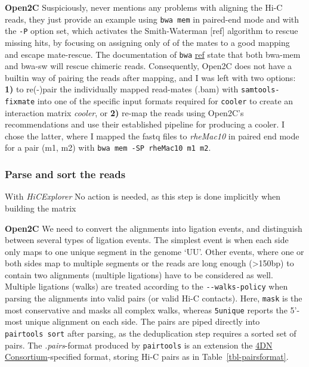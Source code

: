 \documentclass[
  11pt,
  a4paper,
]{scrbook}
\let\oldemph\emph
\renewcommand\emph[1]{\oldemph{\color{gray}#1}}
\begin{document}
\textbf{Open2C} Suspiciously, \citep{open2c} never mentions any problems
with aligning the Hi-C reads, they just provide an example using
\texttt{bwa\ mem} in paired-end mode and with the \texttt{-P} option
set, which activates the Smith-Waterman {[}ref{]} algorithm to rescue
missing hits, by focusing on assigning only of of the mates to a good
mapping and escape mate-rescue. The documentation of \texttt{bwa}
\href{https://bio-bwa.sourceforge.net}{ref} state that both bwa-mem and
bwa-sw will rescue chimeric reads. Consequently, Open2C does not have a
builtin way of pairing the reads after mapping, and I was left with two
options: \textbf{1)} to re(-)pair the individually mapped read-mates
(.bam) with \texttt{samtools-fixmate} into one of the specific input
formats required for \texttt{cooler} to create an interaction matrix
\emph{cooler}, or \textbf{2)} re-map the reads using Open2C's
recommendations and use their established pipeline for producing a
cooler. I chose the latter, where I mapped the fastq files to
\emph{rheMac10} in paired end mode for a pair (m1, m2) with
\texttt{bwa\ mem\ -SP\ rheMac10\ m1\ m2}.

\subsubsection{Parse and sort the reads}\label{parse-and-sort-the-reads}

With \emph{HiCExplorer} No action is needed, as this step is done
implicitly when building the matrix

\textbf{Open2C} We need to convert the alignments into ligation events,
and distinguish between several types of ligation events. The simplest
event is when each side only maps to one unique segment in the genome
`UU'. Other events, where one or both sides map to multiple segments or
the reads are long enough (\textgreater150bp) to contain two alignments
(multiple ligations) have to be considered as well. Multiple ligations
(walks) are treated according to the \texttt{-\/-walks-policy} when
parsing the alignments into valid pairs (or valid Hi-C contacts). Here,
\texttt{mask} is the most conservative and masks all complex walks,
whereas \texttt{5unique} reports the 5'-most unique alignment on each
side. The pairs are piped directly into \texttt{pairtools\ sort} after
parsing, as the deduplication step requires a sorted set of pairs. The
\emph{.pairs}-format produced by \texttt{pairtools} is an extension the
\href{https://data.4dnucleome.org/file-formats/pairs/}{4DN
Consortium}-specified format, storing Hi-C pairs as in
Table~\ref{tbl-pairsformat}.
\end{document}
